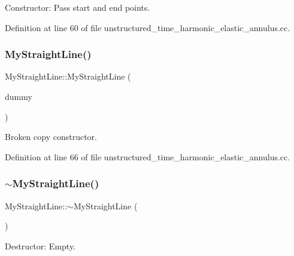 Constructor\+: Pass start and end points. 



Definition at line 60 of file unstructured\+\_\+time\+\_\+harmonic\+\_\+elastic\+\_\+annulus.\+cc.

\mbox{\label{classMyStraightLine_a4c42312f35a3cf72f2f39e88ad28202f}} 
\subsubsection{\texorpdfstring{My\+Straight\+Line()}{MyStraightLine()}\hspace{0.1cm}{\footnotesize\ttfamily [2/2]}}
{\footnotesize\ttfamily My\+Straight\+Line\+::\+My\+Straight\+Line (\begin{DoxyParamCaption}\item[{const \hyperlink{classMyStraightLine}{My\+Straight\+Line} \&}]{dummy }\end{DoxyParamCaption})\hspace{0.3cm}{\ttfamily [inline]}}



Broken copy constructor. 



Definition at line 66 of file unstructured\+\_\+time\+\_\+harmonic\+\_\+elastic\+\_\+annulus.\+cc.

\mbox{\label{classMyStraightLine_ae2f9a5860652a726b2f4dc94d1332ef1}} 
\subsubsection{\texorpdfstring{$\sim$\+My\+Straight\+Line()}{~MyStraightLine()}}
{\footnotesize\ttfamily My\+Straight\+Line\+::$\sim$\+My\+Straight\+Line (\begin{DoxyParamCaption}{ }\end{DoxyParamCaption})\hspace{0.3cm}{\ttfamily [inline]}}



Destructor\+: Empty. 



